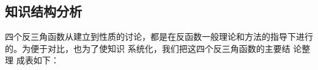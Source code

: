 \subsection{知识结构分析}
四个反三角函数从建立到性质的讨论，都是在反函数一般理论和方法的指导下进行的。为便于对比，也为了使知识
系统化，我们把这四个反三角函数的主要结 论整理 成表如下：










































































































